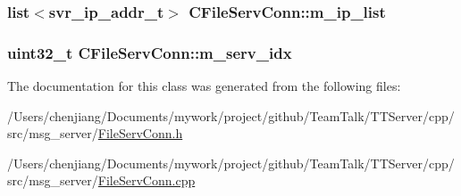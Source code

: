 \subsubsection[{m\+\_\+ip\+\_\+list}]{\setlength{\rightskip}{0pt plus 5cm}list$<${\bf svr\+\_\+ip\+\_\+addr\+\_\+t}$>$ C\+File\+Serv\+Conn\+::m\+\_\+ip\+\_\+list\hspace{0.3cm}{\ttfamily [private]}}\label{class_c_file_serv_conn_a55438152b192f87c31773412265671c5}
\hypertarget{class_c_file_serv_conn_a6eb0716284a88b2ea4fd2ef6135041ff}{}
\subsubsection[{m\+\_\+serv\+\_\+idx}]{\setlength{\rightskip}{0pt plus 5cm}uint32\+\_\+t C\+File\+Serv\+Conn\+::m\+\_\+serv\+\_\+idx\hspace{0.3cm}{\ttfamily [private]}}\label{class_c_file_serv_conn_a6eb0716284a88b2ea4fd2ef6135041ff}


The documentation for this class was generated from the following files\+:\begin{DoxyCompactItemize}
\item 
/\+Users/chenjiang/\+Documents/mywork/project/github/\+Team\+Talk/\+T\+T\+Server/cpp/src/msg\+\_\+server/\hyperlink{_file_serv_conn_8h}{File\+Serv\+Conn.\+h}\item 
/\+Users/chenjiang/\+Documents/mywork/project/github/\+Team\+Talk/\+T\+T\+Server/cpp/src/msg\+\_\+server/\hyperlink{_file_serv_conn_8cpp}{File\+Serv\+Conn.\+cpp}\end{DoxyCompactItemize}
